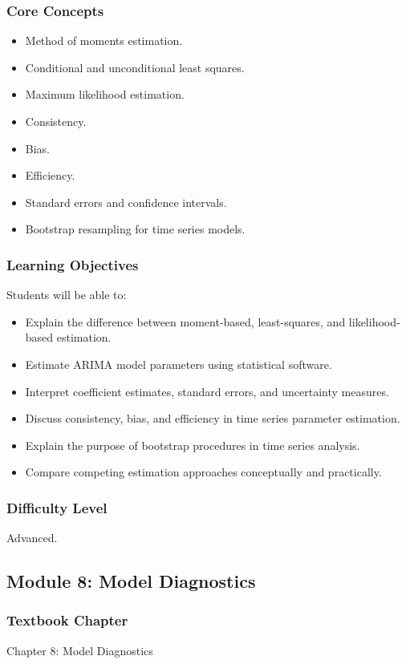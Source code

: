 \documentclass[11pt]{article}
\begin{document}
\subsubsection*{Core Concepts}
\begin{itemize}
    \item Method of moments estimation.
    \item Conditional and unconditional least squares.
    \item Maximum likelihood estimation.
    \item Consistency.
    \item Bias.
    \item Efficiency.
    \item Standard errors and confidence intervals.
    \item Bootstrap resampling for time series models.
\end{itemize}

\subsubsection*{Learning Objectives}
Students will be able to:
\begin{itemize}
    \item Explain the difference between moment-based, least-squares, and likelihood-based estimation.
    \item Estimate ARIMA model parameters using statistical software.
    \item Interpret coefficient estimates, standard errors, and uncertainty measures.
    \item Discuss consistency, bias, and efficiency in time series parameter estimation.
    \item Explain the purpose of bootstrap procedures in time series analysis.
    \item Compare competing estimation approaches conceptually and practically.
\end{itemize}

\subsubsection*{Difficulty Level}
Advanced.

\subsection{Module 8: Model Diagnostics}

\subsubsection*{Textbook Chapter}
Chapter 8: Model Diagnostics
\end{document}
